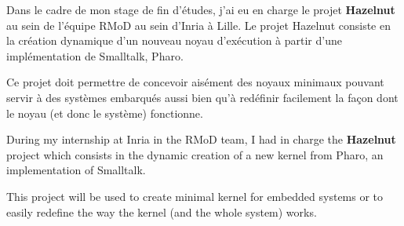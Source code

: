 \vfill 


Dans le cadre de mon stage de fin d'\'{e}tudes, j'ai eu en charge le projet \textbf{Hazelnut} au sein de l'\'{e}quipe RMoD au sein d'Inria \`{a} Lille. Le projet Hazelnut consiste en la cr\'{e}ation dynamique d'un nouveau noyau d'ex\'{e}cution \`{a} partir d'une \mbox{impl\'{e}mentation} de Smalltalk, Pharo. 

Ce projet doit permettre de concevoir ais\'{e}ment des noyaux minimaux pouvant servir \`{a} des syst\`{e}mes embarqu\'{e}s aussi bien qu'\`{a} red\'{e}finir facilement la fa\c{c}on dont le noyau (et donc le syst\`{e}me) fonctionne.


\vfill


During my internship at Inria in the RMoD team, I had in charge the \textbf{Hazelnut} project which consists in the dynamic creation of a new kernel from Pharo, an implementation of Smalltalk.

This project will be used to create minimal kernel for embedded systems or to easily redefine the way the kernel (and the whole system) works.

\vfill

\newpage